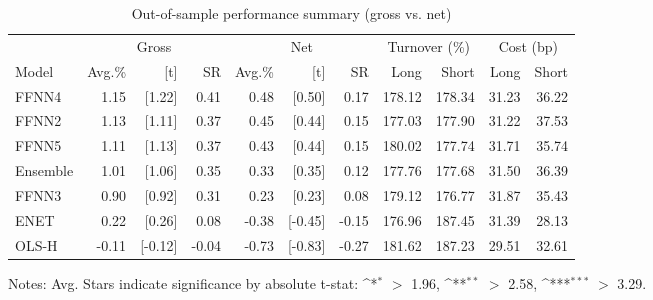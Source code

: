 \begin{table}[!ht]
\centering
\caption{Out-of-sample performance summary (gross vs. net)}
\label{tab:summary_performance}
\begingroup
\def\sym#1{\ifmmode^{#1}\else\(^{#1}\)\fi}
\setlength{\tabcolsep}{6pt}
\renewcommand{\arraystretch}{1.2}
\begin{tabular}{lrrrrrrrrrr}
\toprule
& \multicolumn{3}{c}{Gross} & \multicolumn{3}{c}{Net} & \multicolumn{2}{c}{Turnover (\%)} & \multicolumn{2}{c}{Cost (bp)}\\
\cmidrule(lr){2-4}\cmidrule(lr){5-7}\cmidrule(lr){8-9}\cmidrule(lr){10-11}
Model & Avg.\% & {[t]} & SR & Avg.\% & {[t]} & SR & Long & Short & Long & Short\\
\midrule
FFNN4 & 1.15 & [1.22] & 0.41 & 0.48 & [0.50] & 0.17 & 178.12 & 178.34 & 31.23 & 36.22 \\
FFNN2 & 1.13 & [1.11] & 0.37 & 0.45 & [0.44] & 0.15 & 177.03 & 177.90 & 31.22 & 37.53 \\
FFNN5 & 1.11 & [1.13] & 0.37 & 0.43 & [0.44] & 0.15 & 180.02 & 177.74 & 31.71 & 35.74 \\
Ensemble & 1.01 & [1.06] & 0.35 & 0.33 & [0.35] & 0.12 & 177.76 & 177.68 & 31.50 & 36.39 \\
FFNN3 & 0.90 & [0.92] & 0.31 & 0.23 & [0.23] & 0.08 & 179.12 & 176.77 & 31.87 & 35.43 \\
ENET & 0.22 & [0.26] & 0.08 & -0.38 & [-0.45] & -0.15 & 176.96 & 187.45 & 31.39 & 28.13 \\
OLS-H & -0.11 & [-0.12] & -0.04 & -0.73 & [-0.83] & -0.27 & 181.62 & 187.23 & 29.51 & 32.61 \\
\bottomrule
\end{tabular}
\par\smallskip \footnotesize Notes: Avg.%
Stars indicate significance by absolute t-stat: \sym{*} $>$ 1.96, \sym{**} $>$ 2.58, \sym{***} $>$ 3.29.
\endgroup
\end{table}